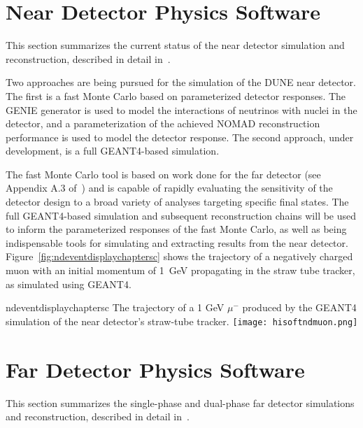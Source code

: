\section{Near Detector Physics Software}
\label{sec:detectors-sc-nd-physics-software}

This section summarizes the %
current status of the near detector
simulation and reconstruction, described in detail in~\cite{cdr-annex-reco}. %

Two approaches are being  pursued for the simulation of
the DUNE near detector.  The first is a fast Monte Carlo based on
parameterized detector responses. The GENIE\cite{GENIE} generator is
used to model the interactions of neutrinos with nuclei in the
detector, and a parameterization of the achieved NOMAD reconstruction
performance is used to model the detector response.  
The second
approach, under development, is a full GEANT4-based simulation. 
 
 The fast Monte Carlo tool is based on work done for the
far detector (see Appendix A.3 of~\cite{Adams:2013qkq}) and is capable of
rapidly evaluating the sensitivity of the detector design to a broad
variety of analyses targeting specific final states.  The full
GEANT4-based simulation and subsequent reconstruction chains will be
used to inform the parameterized responses of the fast Monte Carlo, as
well as being indispensable tools for simulating and extracting
results from the near detector.
Figure~\ref{fig:ndeventdisplaychaptersc} shows the trajectory of a
negatively charged muon with an initial momentum of 1~GeV propagating
in the straw tube tracker, as simulated using GEANT4.
\begin{cdrfigure}{ndeventdisplaychaptersc}
{The trajectory of a 1 GeV $\mu^-$ produced by the GEANT4 simulation of the near detector's straw-tube tracker.}
\texttt{[image: hisoftndmuon.png]}
\end{cdrfigure}

\section{Far Detector Physics Software}
\label{sec:detectors-sc-physics-software}

This section summarizes %
the single-phase and dual-phase far detector
simulations and reconstruction, described in detail in~\cite{cdr-annex-reco}. %

